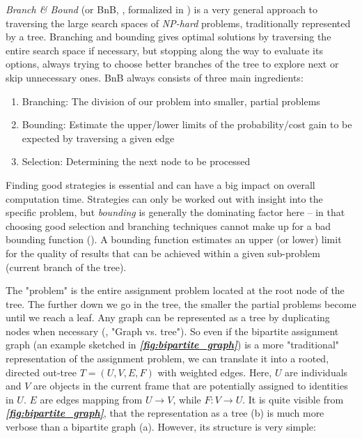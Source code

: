 \documentclass[9pt,lineno]{elife}
\newcommand{\figref}[1]{\textit{\textbf{\ref{#1}}}}
\begin{document}
\begin{appendixbox}

\textit{Branch \& Bound} (or BnB, \cite{land1960automatic}, formalized in \cite{little1963algorithm}) is a very general approach to traversing the large search spaces of \textit{NP-hard} problems, traditionally represented by a tree. Branching and bounding gives optimal solutions by traversing the entire search space if necessary, but stopping along the way to evaluate its options, always trying to choose better branches of the tree to explore next or skip unnecessary ones. BnB always consists of three main ingredients:

\begin{enumerate} \label{enum:bnb_rules}
    \item Branching: The division of our problem into smaller, partial problems
    \item Bounding: Estimate the upper/lower limits of the probability/cost gain to be expected by traversing a given edge
    \item Selection: Determining the next node to be processed
\end{enumerate}

Finding good strategies is essential and can have a big impact on overall computation time. Strategies can only be worked out with insight into the specific problem, but \textit{bounding} is generally the dominating factor here -- in that choosing good selection and branching techniques cannot make up for a bad bounding function (\cite{clausen1999branch}). A bounding function estimates an upper (or lower) limit for the quality of results that can be achieved within a given sub-problem (current branch of the tree).

The "problem" is the entire assignment problem located at the root node of the tree. The further down we go in the tree, the smaller the partial problems become until we reach a leaf. Any graph can be represented as a tree by duplicating nodes when necessary (\cite{zhang1996branch}, "Graph vs. tree"). So even if the bipartite assignment graph (an example sketched in \figref{fig:bipartite_graph}) is a more "traditional" representation of the assignment problem, we can translate it into a rooted, directed out-tree $T = (U,V,E,F)$ with weighted edges. Here, $U$ are individuals and $V$ are objects in the current frame that are potentially assigned to identities in $U$. $E$ are edges mapping from $U\rightarrow V$, while $F: V\rightarrow U$. It is quite visible from \figref{fig:bipartite_graph}, that the representation as a tree (b) is much more verbose than a bipartite graph (a). However, its structure is very simple:


\end{appendixbox}
\end{document}

